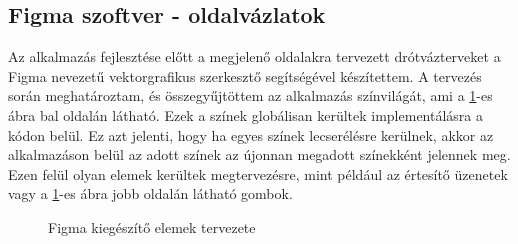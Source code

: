 \subsection{Figma szoftver - oldalvázlatok}
Az alkalmazás fejlesztése előtt a megjelenő oldalakra tervezett drótvázterveket a Figma\cite{figma} nevezetű vektorgrafikus szerkesztő segítségével készítettem. A tervezés során meghatároztam, és összegyűjtöttem az alkalmazás színvilágát, ami a \ref{fig.picture-11}-es ábra bal oldalán látható. Ezek a színek globálisan kerültek implementálásra a kódon belül. Ez azt jelenti, hogy ha egyes színek lecserélésre kerülnek, akkor az alkalmazáson belül az adott színek az újonnan megadott színekként jelennek meg. Ezen felül olyan elemek kerültek megtervezésre, mint például az értesítő üzenetek vagy a \ref{fig.picture-11}-es ábra jobb oldalán látható gombok.
\begin{figure}[H]
	\centering
	\hspace{5pt}
	\caption{Figma kiegészítő elemek tervezete}
	\label{fig.picture-11}
\end{figure}

